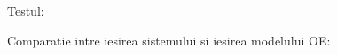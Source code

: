 \documentclass[12pt,english]{article}
\begin{document}
\begin{center}
\end{center}

Testul:
\begin{center}
\end{center}

Comparatie intre iesirea sistemului si iesirea modelului OE:
\begin{center}
\end{center}
\end{document}
